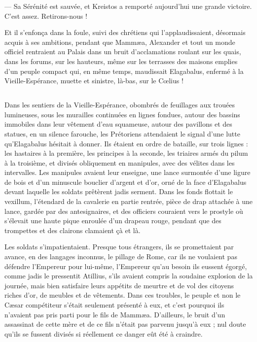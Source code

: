 \documentclass[a4paper, 11pt, oneside, polutonikogreek, french]{article}
\begin{document}
--- Sa Sérénité est sauvée, et Kreistos a remporté aujourd'hui une grande victoire. C'est assez. Retirons-nous !

Et il s'enfonça dans la foule, suivi des chrétiens qui l'applaudissaient, désormais acquis à ses ambitions, pendant que Mammæa, Alexander et tout un monde officiel rentraient au Palais dans un bruit d'acclamations roulant sur les quais, dans les forums, sur les hauteurs, même sur les terrasses des maisons emplies d'un peuple compact qui, en même temps, maudissait Elagabalus, enfermé à la Vieille-Espérance, muette et sinistre, là-bas, sur le Cœlius !
\clearpage
\subsection{}
\paragraph{}
Dans les sentiers de la Vieille-Espérance, obombrés de feuillages aux trouées lumineuses, sous les murailles continuées en lignes fondues, autour des bassins immobiles dans leur vêtement d'eau squameuse, autour des pavillons et des statues, en un silence farouche, les Prétoriens attendaient le signal d'une lutte qu'Elagabalus hésitait à donner. Ils étaient en ordre de bataille, sur trois lignes : les hastaires à la première, les principes à la seconde, les triaires armés du pilum à la troisième, et divisés obliquement en manipules, avec des vélites dans les intervalles. Les manipules avaient leur enseigne, une lance surmontée d'une ligure de bois et d'un minuscule bouclier d'argent et d'or, orné de la face d'Elagabalus devant laquelle les soldats prêtèrent jadis serment. Dans les fonds flottait le vexillum, l'étendard de la cavalerie en partie rentrée, pièce de drap attachée à une lance, gardée par des antesignaires, et des officiers couraient vers le prostyle où s'élevait une haute pique enroulée d'un drapeau rouge, pendant que des trompettes et des clairons clamaient çà et là.

Les soldats s'impatientaient. Presque tous étrangers, ils se promettaient par avance, en des langages inconnus, le pillage de Rome, car ils ne voulaient pas défendre l'Empereur pour lui-même, l'Empereur qu'au besoin ils eussent égorgé, comme jadis le pressentit Atillius, s'ils avaient compris la soudaine explosion de la journée, mais bien satisfaire leurs appétits de meurtre et de vol des citoyens riches d'or, de meubles et de vêtements. Dans ces troubles, le peuple et non le Cæsar compétiteur s'était seulement présenté à eux, et c'est pourquoi ils n'avaient pas pris parti pour le fils de Mammæa. D'ailleurs, le bruit d'un assassinat de cette mère et de ce fils n'était pas parvenu jusqu'à eux ; nul doute qu'ils se fussent divisés si réellement ce danger eût été à craindre.
\end{document}
